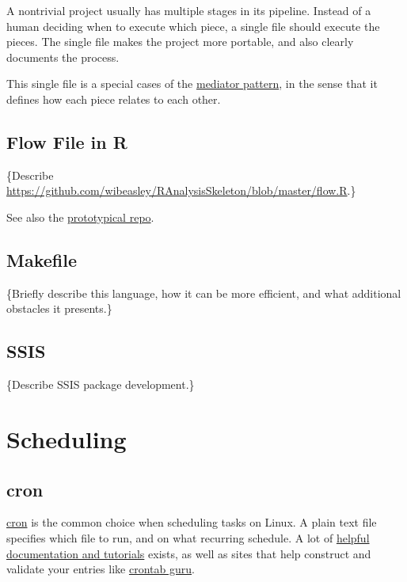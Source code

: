 \documentclass[
]{book}
\begin{document}
A nontrivial project usually has multiple stages in its pipeline. Instead of a human deciding when to execute which piece, a single file should execute the pieces. The single file makes the project more portable, and also clearly documents the process.

This single file is a special cases of the \href{https://en.wikipedia.org/wiki/Mediator_pattern}{mediator pattern}, in the sense that it defines how each piece relates to each other.

\hypertarget{automation-flow}{%
\subsection{Flow File in R}\label{automation-flow}}

\{Describe \url{https://github.com/wibeasley/RAnalysisSkeleton/blob/master/flow.R}.\}

See also the \protect\hyperlink{repo-flow}{prototypical repo}.

\hypertarget{automation-makefile}{%
\subsection{Makefile}\label{automation-makefile}}

\{Briefly describe this language, how it can be more efficient, and what additional obstacles it presents.\}

\hypertarget{automation-ssis}{%
\subsection{SSIS}\label{automation-ssis}}

\{Describe SSIS package development.\}

\hypertarget{automation-scheduling}{%
\section{Scheduling}\label{automation-scheduling}}

\hypertarget{automation-cron}{%
\subsection{cron}\label{automation-cron}}

\href{https://en.wikipedia.org/wiki/Cron}{cron} is the common choice when scheduling tasks on Linux. A plain text file specifies which file to run, and on what recurring schedule. A lot of \href{https://www.computerhope.com/unix/ucrontab.htm}{helpful documentation and tutorials} exists, as well as sites that help construct and validate your entries like \href{https://crontab.guru/}{crontab guru}.
\end{document}
